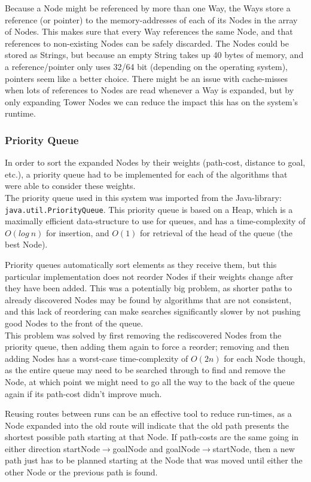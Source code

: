 Because a Node might be referenced by more than one Way, the Ways store a reference (or pointer) to the memory-addresses of each of its Nodes in the array of Nodes. This makes sure that every Way references the same Node, and that references to non-existing Nodes can be safely discarded. The Nodes could be stored as Strings, but because an empty String takes up 40 bytes of memory, and a reference/pointer only uses 32/64 bit (depending on the operating system), pointers seem like a better choice. There might be an issue with cache-misses when lots of references to Nodes are read whenever a Way is expanded, but by only expanding Tower Nodes we can reduce the impact this has on the system's runtime.

\newpage
\subsubsection{Priority Queue}
In order to sort the expanded Nodes by their weights (path-cost, distance to goal, etc.), a priority queue had to be implemented for each of the algorithms that were able to consider these weights.\\The priority queue used in this system was imported from the Java-library: \verb|java.util.PriorityQueue|. This priority queue is based on a Heap, which is a maximally efficient data-structure to use for queues, and has a time-complexity of $O(log~n)$ for insertion, and $O(1)$ for retrieval of the head of the queue (the best Node).

Priority queues automatically sort elements as they receive them, but this particular implementation does not reorder Nodes if their weights change after they have been added. This was a potentially big problem, as shorter paths to already discovered Nodes may be found by algorithms that are not consistent, and this lack of reordering can make searches significantly slower by not pushing good Nodes to the front of the queue.\\
This problem was solved by first removing the rediscovered Nodes from the priority queue, then adding them again to force a reorder; removing and then adding Nodes has a worst-case time-complexity of $O(2n)$ for each Node though, as the entire queue may need to be searched through to find and remove the Node, at which point we might need to go all the way to the back of the queue again if its path-cost didn't improve much.

Reusing routes between runs can be an effective tool to reduce run-times, as a Node expanded into the old route will indicate that the old path presents the shortest possible path starting at that Node. If path-costs are the same going in either direction startNode$\to$goalNode and goalNode$\to$startNode, then a new path just has to be planned starting at the Node that was moved until either the other Node or the previous path is found.


